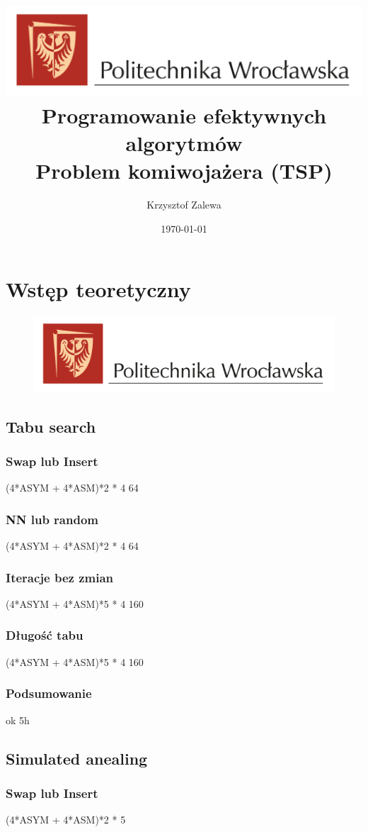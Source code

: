 \documentclass{article}
\title{
  \centering
  \includegraphics[width=\textwidth]{src/images/logo_PWr_kolor_poziom.png}\\
  \fontsize{28pt}{30pt}\selectfont Programowanie efektywnych algorytmów\\
  \fontsize{14pt}{30pt}\selectfont Problem komiwojażera (TSP)}
\author{Krzysztof Zalewa}
\date{\daymonthyear\today}
\begin{document}
    \maketitle
    \pagebreak
    \tableofcontents
    \FloatBarrier
    \section{Wstęp teoretyczny}
      \begin{figure}[ht]
        \centering
        \includegraphics[width=\textwidth]{src/images/logo_PWr_kolor_poziom.png}
        \caption{}
        \label{fig:tex2}
      \end{figure}
      \FloatBarrier
    \subsection{Tabu search}
      \subsubsection{Swap lub Insert} 
        (4*ASYM + 4*ASM)*2 * 4 64
      \subsubsection{NN lub random}
        (4*ASYM + 4*ASM)*2 * 4 64
      \subsubsection{Iteracje bez zmian}
        (4*ASYM + 4*ASM)*5 * 4 160
      \subsubsection{Długość tabu} 
        (4*ASYM + 4*ASM)*5 * 4 160
      \subsubsection{Podsumowanie}ok 5h
    \subsection{Simulated anealing}
      \subsubsection{Swap lub Insert}
        (4*ASYM + 4*ASM)*2 * 5 
\end{document}
